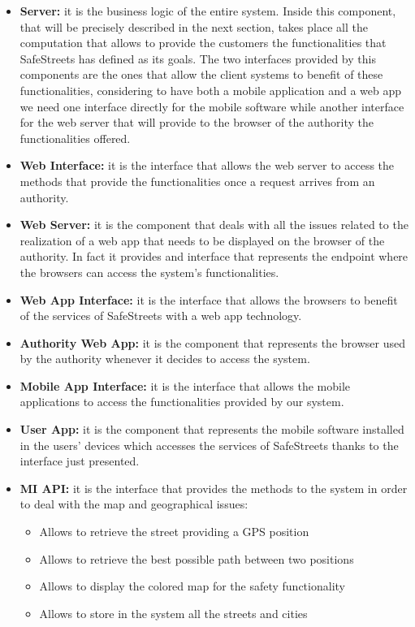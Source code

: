 		\begin{itemize}
			\item \textbf{Server:} it is the business logic of the entire system. Inside this component, that will be precisely described in the next section, takes place all the computation that allows to provide the customers the functionalities that SafeStreets has defined as its goals. The two interfaces provided by this components are the ones that allow the client systems to benefit of these functionalities, considering to have both a mobile application and a web app we need one interface directly for the mobile software while another interface for the web server that will provide to the browser of the authority the functionalities offered.
			
			\item \textbf{Web Interface:} it is the interface that allows the web server to access the methods that provide the functionalities once a request arrives from an authority.
			
			\item \textbf{Web Server:} it is the component that deals with all the issues related to the realization of a web app that needs to be displayed on the browser of the authority. In fact it provides and interface that  represents the endpoint where the browsers can access the system's functionalities.
			
			\item \textbf{Web App Interface:} it is the interface that allows the browsers to benefit of the services of SafeStreets with a web app technology.
			
			\item \textbf{Authority Web App:} it is the component that represents the browser used by the authority whenever it decides to access the system.
			
			\item \textbf{Mobile App Interface:} it is the interface that allows the mobile applications to access the functionalities provided by our system.
			
			\item \textbf{User App:} it is the component that represents the mobile software installed in the users' devices which accesses the services of SafeStreets thanks to the interface just presented.
			
			\item \textbf{MI API:} it is the interface that provides the methods to the system in order to deal with the map and geographical issues:
				\begin{itemize}
					\item Allows to retrieve the street providing a GPS position
					\item Allows to retrieve the best possible path between two positions
					\item Allows to display the colored map for the safety functionality
					\item Allows to store in the system all the streets and cities
				\end{itemize}
			

\end{itemize}

